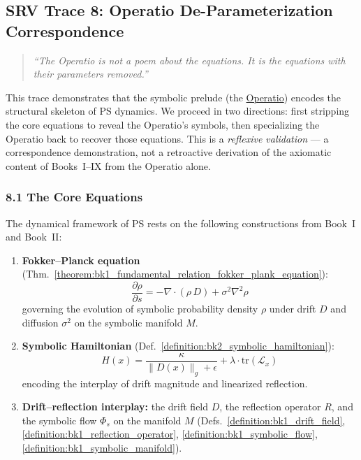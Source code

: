 \subsection*{SRV Trace 8: Operatio De-Parameterization Correspondence}
\label{subsec:appB_srv_trace8}

\begin{quote}
\emph{``The Operatio is not a poem about the equations.
It is the equations with their parameters removed.''}
\end{quote}

\noindent
This trace demonstrates that the symbolic prelude (the \hyperref[sec:bk1_operatio]{Operatio})
encodes the structural skeleton of PS dynamics. We proceed in two directions:
first stripping the core equations to reveal the Operatio's symbols, then
specializing the Operatio back to recover those equations.
This is a \emph{reflexive validation} --- a correspondence demonstration,
not a retroactive derivation of the axiomatic content of Books~I--IX from
the Operatio alone.

\subsubsection*{8.1 The Core Equations}

The dynamical framework of PS rests on the following constructions from Book~I
and Book~II:

\begin{enumerate}
\item \textbf{Fokker--Planck equation}
(Thm.~\ref{theorem:bk1_fundamental_relation_fokker_plank_equation}):
\[
\frac{\partial \rho}{\partial s}
= -\nabla \cdot (\rho\, D) + \sigma^2 \nabla^2 \rho
\]
governing the evolution of symbolic probability density $\rho$ under drift $D$
and diffusion $\sigma^2$ on the symbolic manifold $M$.

\item \textbf{Symbolic Hamiltonian}
(Def.~\ref{definition:bk2_symbolic_hamiltonian}):
\[
H(x) = \frac{\kappa}{\|D(x)\|_g + \epsilon} + \lambda \cdot \mathrm{tr}(\mathcal{L}_x)
\]
encoding the interplay of drift magnitude and linearized reflection.

\item \textbf{Drift--reflection interplay:} the drift field $D$, the reflection
operator $R$, and the symbolic flow $\Phi_s$ on the manifold $M$
(Defs.~\ref{definition:bk1_drift_field}, \ref{definition:bk1_reflection_operator},
\ref{definition:bk1_symbolic_flow}, \ref{definition:bk1_symbolic_manifold}).
\end{enumerate}

